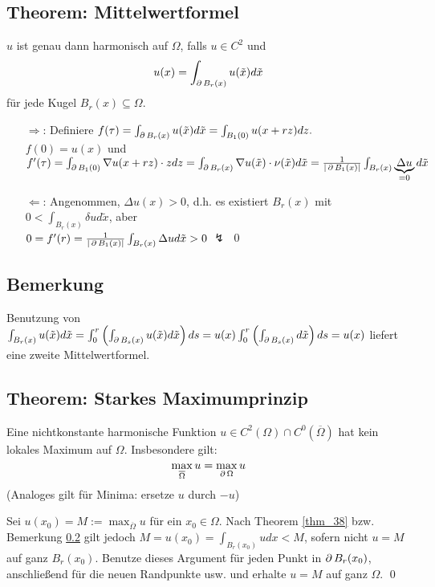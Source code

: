 \subsection{Theorem: Mittelwertformel}
\label{thm:mittelwertformel} \label{thm_38}
	$u$ ist genau dann harmonisch auf $\Omega$, falls $u \in C^2$ und \marginnote{[38]}
	\begin{equation}
		u(x) = \int_{\operatorname{\partial} B_r(x)} u(\tilde{x})d\tilde{x} \label{eq_1305_21}
	\end{equation}
	für jede Kugel $B_r(x) \subseteq \Omega$.
	
	\begin{itemize}
		\item[\glqq$\Rightarrow$\grqq:] Definiere $f(\tau) = \int_{\operatorname{\partial} B_r(x)} u(\tilde{x}) d\tilde{x} = \int_{B_1(0)} u(x+rz) dz.$ \\
		$f(0) = u(x)$ und $f'(\tau) = \int_{\operatorname{\partial} B_1(0)} \nabla u(x+rz)\cdot z dz = \int_{\operatorname{\partial} B_r(x)} \nabla u(\tilde{x}) \cdot \nu(\tilde{x}) d \tilde{x} = \frac{1}{|\operatorname{\partial} B_1(x)|} \int_{B_r(x)} \underbrace{\Delta u}_{=0} d \tilde{x}$
		\item[\glqq$\Leftarrow$\grqq:] Angenommen, $\Delta u(x) > 0$, d.h. es existiert $B_r(x)$ mit $0 < \int_{B_r(x)} \delta u d \tilde{x}$, aber \\ $0 = f'(r) = \frac{1}{|\operatorname{\partial} B_1(x)|} \int_{B_r(x)} \Delta u d \tilde{x} > 0$ $\lightning$ \qed
	\end{itemize}

\subsection{Bemerkung}
\label{bem_39}
	Benutzung \marginnote{[39]} von $\int_{B_r(x)} u(\tilde{x})d\tilde{x} = \int_{0}^{r} \left( \int_{\operatorname{\partial} B_s(x)} u(\tilde{x}) d \tilde{x} \right) ds = u(x) \int_0^r \left( \int_{\operatorname{\partial} B_s(x)} d \tilde{x} \right) ds = u(x)$ liefert eine zweite Mittelwertformel.
	
\subsection{Theorem: Starkes Maximumprinzip}
\label{thm:starkes_maximum} \label{thm_40}
	Eine nichtkonstante harmonische Funktion $u \in C^2(\Omega) \cap C^0(\overline{\Omega})$ hat kein lokales Maximum auf $\Omega$.\marginnote{[40]} Insbesondere gilt:
	\[ \max_{\overline{\Omega}} u = \max_{\operatorname{\partial} \Omega} u \]
	(Analoges gilt für Minima: ersetze $u$ durch $-u$)
	
	Sei $u(x_0) = M := \max_{\overline{\Omega}} u$ für ein $x_0 \in \Omega$. Nach Theorem \ref{thm_38} bzw. Bemerkung \ref{bem_39} gilt jedoch $M = u(x_0) = \int_{B_r(x_0)} u dx < M$, sofern nicht $u = M$ auf ganz $B_r(x_0)$. Benutze dieses Argument für jeden Punkt in $\operatorname{\partial} B_r(x_0)$, anschließend für die neuen Randpunkte usw. und erhalte $u = M$ auf ganz $\Omega$. \qed

